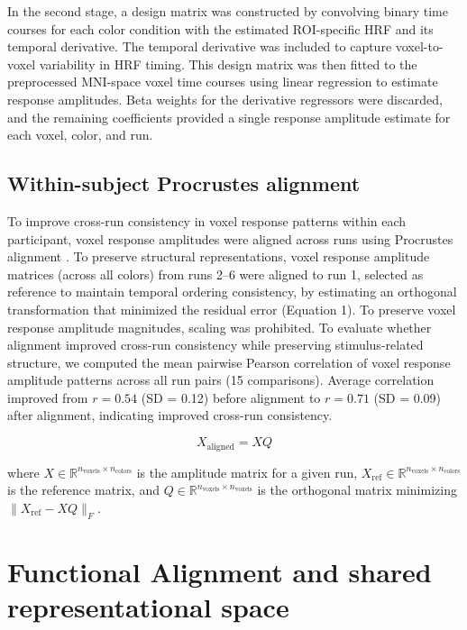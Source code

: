 In the second stage, a design matrix was constructed by convolving binary time courses for each color condition with the estimated ROI-specific HRF and its temporal derivative. The temporal derivative was included to capture voxel-to-voxel variability in HRF timing. This design matrix was then fitted to the preprocessed MNI-space voxel time courses using linear regression to estimate response amplitudes. Beta weights for the derivative regressors were discarded, and the remaining coefficients provided a single response amplitude estimate for each voxel, color, and run.

\subsection*{Within-subject Procrustes alignment}

To improve cross-run consistency in voxel response patterns within each participant, voxel response amplitudes were aligned across runs using Procrustes alignment \cite{gower1975}. To preserve structural representations, voxel response amplitude matrices (across all colors) from runs 2--6 were aligned to run 1, selected as reference to maintain temporal ordering consistency, by estimating an orthogonal transformation that minimized the residual error (Equation 1). To preserve voxel response amplitude magnitudes, scaling was prohibited. To evaluate whether alignment improved cross-run consistency while preserving stimulus-related structure, we computed the mean pairwise Pearson correlation of voxel response amplitude patterns across all run pairs (15 comparisons). Average correlation improved from $r = 0.54$ (SD = 0.12) before alignment to $r = 0.71$ (SD = 0.09) after alignment, indicating improved cross-run consistency.

\begin{equation}
X_{\text{aligned}} = XQ
\end{equation}

where $X \in \mathbb{R}^{n_{\text{voxels}} \times n_{\text{colors}}}$ is the amplitude matrix for a given run, $X_{\text{ref}} \in \mathbb{R}^{n_{\text{voxels}} \times n_{\text{colors}}}$ is the reference matrix, and $Q \in \mathbb{R}^{n_{\text{voxels}} \times n_{\text{voxels}}}$ is the orthogonal matrix minimizing $\|X_{\text{ref}} - XQ\|_F$.

\section{Functional Alignment and shared representational space}


